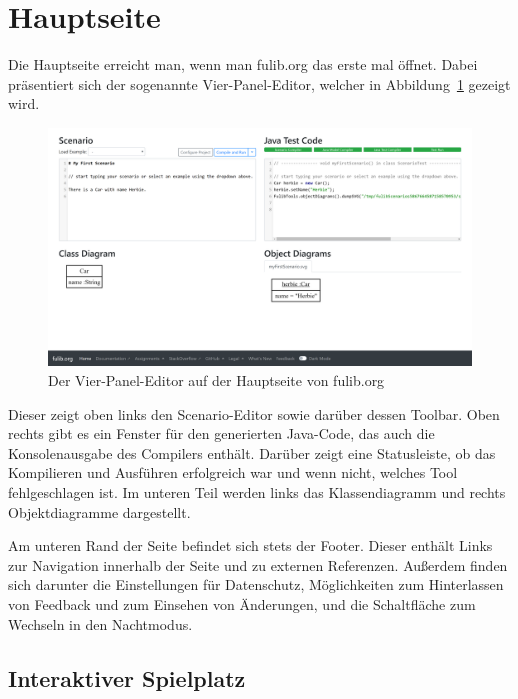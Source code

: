 \section{Hauptseite}\label{sec:main-page}

Die Hauptseite erreicht man, wenn man fulib.org das erste mal öffnet.
Dabei präsentiert sich der sogenannte Vier-Panel-Editor, welcher in Abbildung~\ref{fig:four-pane-editor} gezeigt wird.

\begin{figure}
    \includegraphics[width=\textwidth]{chapter/fulib.org/img/four-pane-editor.png}
    \caption{Der Vier-Panel-Editor auf der Hauptseite von fulib.org}
    \label{fig:four-pane-editor}
\end{figure}

Dieser zeigt oben links den Scenario-Editor sowie darüber dessen Toolbar.
Oben rechts gibt es ein Fenster für den generierten Java-Code, das auch die Konsolenausgabe des Compilers enthält.
Darüber zeigt eine Statusleiste, ob das Kompilieren und Ausführen erfolgreich war und wenn nicht, welches Tool fehlgeschlagen ist.
Im unteren Teil werden links das Klassendiagramm und rechts Objektdiagramme dargestellt.

Am unteren Rand der Seite befindet sich stets der Footer.
Dieser enthält Links zur Navigation innerhalb der Seite und zu externen Referenzen.
Außerdem finden sich darunter die Einstellungen für Datenschutz,
Möglichkeiten zum Hinterlassen von Feedback und zum Einsehen von Änderungen,
und die Schaltfläche zum Wechseln in den Nachtmodus.

\subsection{Interaktiver Spielplatz}\label{subsec:interactive-playground}

